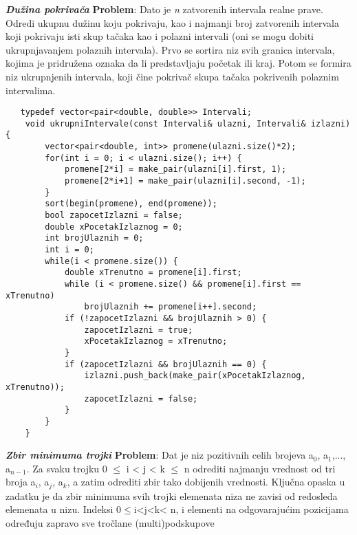 \documentclass{article}
\begin{document}
\vspace{0.1cm}
\textit{\textbf{Dužina pokrivača}}
\vspace{0.2cm}\newline
\textbf{Problem}: Dato je \textit{n} zatvorenih intervala realne prave. Odredi ukupnu dužinu
koju pokrivaju, kao i najmanji broj zatvorenih intervala koji pokrivaju isti skup
tačaka kao i polazni intervali (oni se mogu dobiti ukrupnjavanjem polaznih
intervala).
\newline
Prvo se sortira niz svih
granica intervala, kojima je pridružena oznaka da li predstavljaju početak ili kraj.
Potom se formira niz ukrupnjenih intervala, koji čine pokrivač skupa tačaka
pokrivenih polaznim intervalima. 
\newpage
\begin{lstlisting}
   typedef vector<pair<double, double>> Intervali;
    void ukrupniIntervale(const Intervali& ulazni, Intervali& izlazni) {
        vector<pair<double, int>> promene(ulazni.size()*2);
        for(int i = 0; i < ulazni.size(); i++) {
            promene[2*i] = make_pair(ulazni[i].first, 1);
            promene[2*i+1] = make_pair(ulazni[i].second, -1);
        }
        sort(begin(promene), end(promene));
        bool zapocetIzlazni = false;
        double xPocetakIzlaznog = 0;
        int brojUlaznih = 0;
        int i = 0;
        while(i < promene.size()) {
            double xTrenutno = promene[i].first;
            while (i < promene.size() && promene[i].first == xTrenutno)
                brojUlaznih += promene[i++].second;
            if (!zapocetIzlazni && brojUlaznih > 0) {
                zapocetIzlazni = true;
                xPocetakIzlaznog = xTrenutno;
            }
            if (zapocetIzlazni && brojUlaznih == 0) {
                izlazni.push_back(make_pair(xPocetakIzlaznog, xTrenutno));
                zapocetIzlazni = false;
            }
        }
    }
\end{lstlisting}
\vspace{0.1cm}
\textit{\textbf{Zbir minimuma trojki}}
\vspace{0.2cm}\newline
\textbf{Problem}: Dat je niz pozitivnih celih brojeva a$_0$, a$_1$,..., a$_{n-1}$. Za svaku trojku
0 $\leq$ i < j < k $\leq$ n odrediti najmanju vrednost od tri broja a$_i$, a$_j$, a$_k$, a zatim
odrediti zbir tako dobijenih vrednosti.
\newline
Ključna opaska u zadatku je da zbir minimuma svih trojki elemenata niza ne zavisi od redosleda elemenata u nizu. Indeksi 0$\leq$i<j<k< n, i elementi
na odgovarajućim pozicijama određuju zapravo sve tročlane (multi)podskupove
\end{document}
